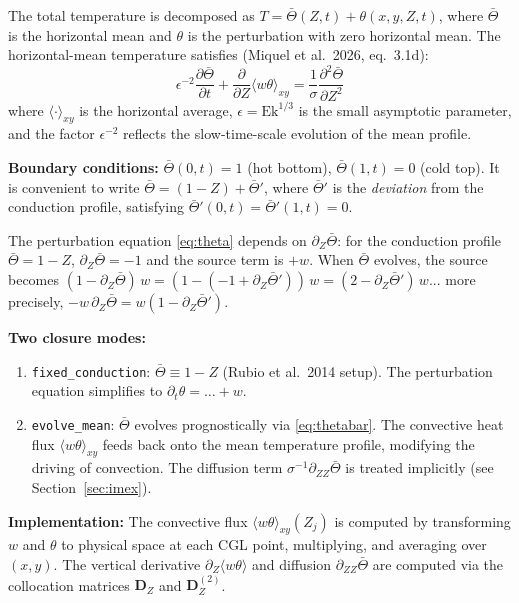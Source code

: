 \documentclass[11pt]{article}
\newcommand{\pderiv}[2]{\frac{\partial #1}{\partial #2}}
\newcommand{\avg}[1]{\langle #1 \rangle}
\newcommand{\Dvec}{\bm{D}}
\begin{document}
The total temperature is decomposed as $T = \bar\Theta(Z,t) + \theta(x,y,Z,t)$, where $\bar\Theta$ is the horizontal mean and $\theta$ is the perturbation with zero horizontal mean. The horizontal-mean temperature satisfies (Miquel et al.\ 2026, eq.\ 3.1d):
\begin{equation}
\boxed{
\epsilon^{-2}\pderiv{\bar\Theta}{t} + \pderiv{}{Z}\avg{w\theta}_{xy} = \frac{1}{\sigma}\pderiv{^2\bar\Theta}{Z^2}
}
\label{eq:thetabar}
\end{equation}
where $\avg{\cdot}_{xy}$ is the horizontal average, $\epsilon = \mathrm{Ek}^{1/3}$ is the small asymptotic parameter, and the factor $\epsilon^{-2}$ reflects the slow-time-scale evolution of the mean profile.

\noindent\textbf{Boundary conditions:} $\bar\Theta(0,t) = 1$ (hot bottom), $\bar\Theta(1,t) = 0$ (cold top). It is convenient to write $\bar\Theta = (1-Z) + \bar\Theta'$, where $\bar\Theta'$ is the \emph{deviation} from the conduction profile, satisfying $\bar\Theta'(0,t) = \bar\Theta'(1,t) = 0$.

The perturbation equation \eqref{eq:theta} depends on $\partial_Z\bar\Theta$: for the conduction profile $\bar\Theta = 1-Z$, $\partial_Z\bar\Theta = -1$ and the source term is $+w$. When $\bar\Theta$ evolves, the source becomes $(1 - \partial_Z\bar\Theta)\,w = (1 - (-1 + \partial_Z\bar\Theta'))\,w = (2 - \partial_Z\bar\Theta')\,w$... more precisely, $-w\,\partial_Z\bar\Theta = w(1 - \partial_Z\bar\Theta')$.

\noindent\textbf{Two closure modes:}
\begin{enumerate}[nosep]
\item \texttt{fixed\_conduction}: $\bar\Theta \equiv 1 - Z$ (Rubio et al.\ 2014 setup). The perturbation equation simplifies to $\partial_t\theta = \ldots + w$.
\item \texttt{evolve\_mean}: $\bar\Theta$ evolves prognostically via \eqref{eq:thetabar}. The convective heat flux $\avg{w\theta}_{xy}$ feeds back onto the mean temperature profile, modifying the driving of convection. The diffusion term $\sigma^{-1}\partial_{ZZ}\bar\Theta$ is treated implicitly (see Section~\ref{sec:imex}).
\end{enumerate}

\noindent\textbf{Implementation:} The convective flux $\avg{w\theta}_{xy}(Z_j)$ is computed by transforming $w$ and $\theta$ to physical space at each CGL point, multiplying, and averaging over $(x,y)$. The vertical derivative $\partial_Z\avg{w\theta}$ and diffusion $\partial_{ZZ}\bar\Theta$ are computed via the collocation matrices $\Dvec_Z$ and $\Dvec_Z^{(2)}$.
\end{document}
